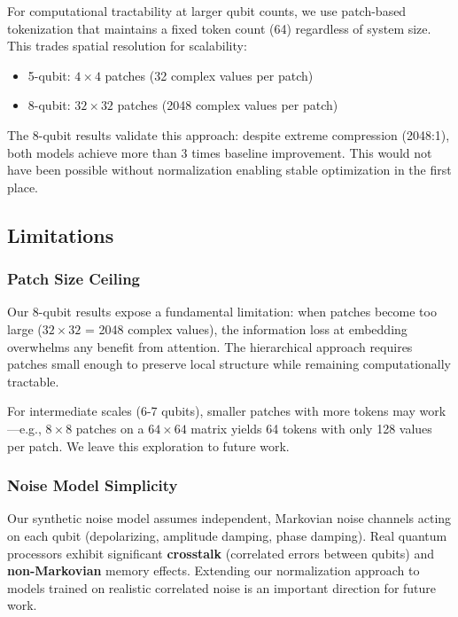 \documentclass[11pt]{article}
\begin{document}
For computational tractability at larger qubit counts, we use patch-based tokenization that maintains a fixed token count (64) regardless of system size. This trades spatial resolution for scalability:
\begin{itemize}
\item 5-qubit: \(4\times 4\) patches (32 complex values per patch)
\item 8-qubit: \(32\times 32\) patches (2048 complex values per patch)
\end{itemize}

The 8-qubit results validate this approach: despite extreme compression (2048:1), both models achieve more than 3 times baseline improvement. This would not have been possible without normalization enabling stable optimization in the first place.

\subsection{Limitations}
\label{sec:org43b0d82}

\subsubsection{Patch Size Ceiling}
\label{sec:orgfc04d0b}

Our 8-qubit results expose a fundamental limitation: when patches become too large (\(32\times 32\) = 2048 complex values), the information loss at embedding overwhelms any benefit from attention. The hierarchical approach requires patches small enough to preserve local structure while remaining computationally tractable.

For intermediate scales (6-7 qubits), smaller patches with more tokens may work---e.g., \(8\times 8\) patches on a \(64\times 64\) matrix yields 64 tokens with only 128 values per patch. We leave this exploration to future work.

\subsubsection{Noise Model Simplicity}
\label{sec:org2a1ae7b}

Our synthetic noise model assumes independent, Markovian noise channels acting on each qubit (depolarizing, amplitude damping, phase damping). Real quantum processors exhibit significant \textbf{crosstalk} (correlated errors between qubits) and \textbf{non-Markovian} memory effects. Extending our normalization approach to models trained on realistic correlated noise is an important direction for future work.
\end{document}
